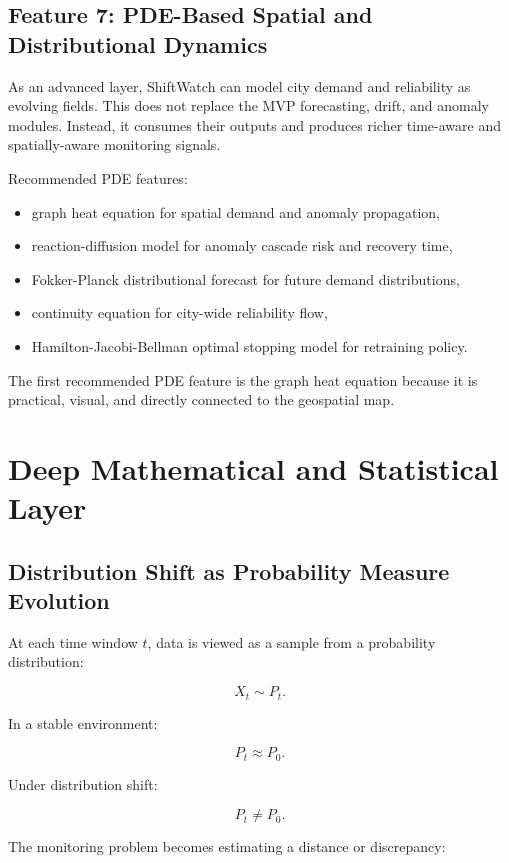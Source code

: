 \documentclass[11pt]{article}
\begin{document}
\subsection{Feature 7: PDE-Based Spatial and Distributional Dynamics}

As an advanced layer, ShiftWatch can model city demand and reliability as evolving fields. This does not replace the MVP forecasting, drift, and anomaly modules. Instead, it consumes their outputs and produces richer time-aware and spatially-aware monitoring signals.

Recommended PDE features:

\begin{itemize}
    \item graph heat equation for spatial demand and anomaly propagation,
    \item reaction-diffusion model for anomaly cascade risk and recovery time,
    \item Fokker-Planck distributional forecast for future demand distributions,
    \item continuity equation for city-wide reliability flow,
    \item Hamilton-Jacobi-Bellman optimal stopping model for retraining policy.
\end{itemize}

The first recommended PDE feature is the graph heat equation because it is practical, visual, and directly connected to the geospatial map.

\section{Deep Mathematical and Statistical Layer}

\subsection{Distribution Shift as Probability Measure Evolution}

At each time window $t$, data is viewed as a sample from a probability distribution:

\[
    X_t \sim P_t.
\]

In a stable environment:

\[
    P_t \approx P_0.
\]

Under distribution shift:

\[
    P_t \neq P_0.
\]

The monitoring problem becomes estimating a distance or discrepancy:
\end{document}
